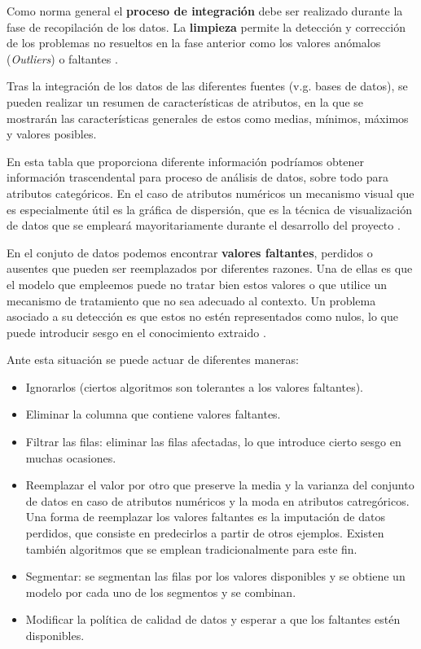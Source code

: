 Como norma general el \textbf{proceso de integración} debe ser realizado durante la fase de recopilación de los datos.
La \textbf{limpieza} permite la detección y corrección de los problemas no resueltos en la fase anterior como los valores anómalos (\textit{Outliers}) o faltantes 
\cite{book:hernandez2004}.  

Tras la integración de los datos de las diferentes fuentes (v.g. bases de datos), se pueden realizar un resumen de características de atributos, en la que
se mostrarán las características generales de estos como medias, mínimos, máximos y valores posibles. 

En esta tabla que proporciona diferente información podríamos obtener información trascendental para proceso de análisis de datos, sobre todo para atributos categóricos.
En el caso de atributos numéricos un mecanismo visual que es especialmente útil es la gráfica de dispersión, que es la técnica de visualización
de datos que se empleará mayoritariamente durante el desarrollo del proyecto \cite{book:hernandez2004}.

En el conjuto de datos podemos encontrar \textbf{valores faltantes}, perdidos o ausentes que pueden ser reemplazados por diferentes razones. Una de ellas es que
el modelo que empleemos puede no tratar bien estos valores o que utilice un mecanismo de tratamiento que no sea adecuado al contexto.
Un problema asociado a su detección es que estos no estén representados como nulos, lo que puede introducir sesgo en el conocimiento
extraido \cite{book:hernandez2004}.

Ante esta situación se puede actuar de diferentes maneras:
\begin{itemize}
    \item Ignorarlos (ciertos algoritmos son tolerantes a los valores faltantes).
    \item Eliminar la columna que contiene valores faltantes.
    \item Filtrar las filas: eliminar las filas afectadas, lo que introduce cierto sesgo en muchas ocasiones.
    \item Reemplazar el valor por otro que preserve la media y la varianza del conjunto de datos en caso de atributos numéricos y la moda en atributos
        catregóricos.
        Una forma de reemplazar los valores faltantes es la imputación de datos perdidos, que consiste en predecirlos a partir de otros ejemplos. Existen también
        algoritmos que se emplean tradicionalmente para este fin.
    \item Segmentar: se segmentan las filas por los valores disponibles y se obtiene un modelo por cada uno de los segmentos y se combinan.
    \item Modificar la política de calidad de datos y esperar a que los faltantes estén disponibles.
\end{itemize}

